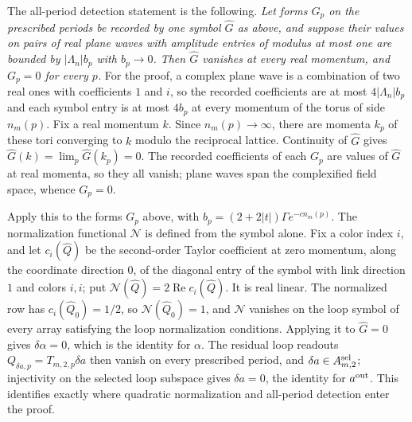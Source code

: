 The all-period detection statement is the following. \emph{Let
forms $G_p$ on the prescribed periods be recorded by one symbol
$\widehat G$ as above, and suppose their values on pairs of real
plane waves with amplitude entries of modulus at most one are bounded
by $|\Lambda_n|b_p$ with $b_p\to0$. Then $\widehat G$ vanishes at
every real momentum, and $G_p=0$ for every $p$.} For the proof, a
complex plane wave is a combination of two real ones with
coefficients $1$ and $i$, so the recorded coefficients are at most
$4|\Lambda_n|b_p$ and each symbol entry is at most $4b_p$ at every
momentum of the torus of side $n_m(p)$. Fix a real momentum $k$.
Since $n_m(p)\to\infty$, there are momenta $k_p$ of these tori
converging to $k$ modulo the reciprocal lattice. Continuity of
$\widehat G$ gives $\widehat G(k)=\lim_p\widehat G(k_p)=0$. The
recorded coefficients of each $G_p$ are values of $\widehat G$ at
real momenta, so they all vanish; plane waves span the complexified
field space, whence $G_p=0$.

Apply this to the forms $G_p$ above, with
$b_p=(2+2|t|)\Gamma e^{-cn_m(p)}$. The normalization functional
$\mathcal N$ is defined from the symbol alone. Fix a color index
$i$, and let $c_i(\widehat Q)$ be the second-order Taylor coefficient
at zero momentum, along the coordinate direction $0$, of the
diagonal entry of the symbol with link direction $1$ and colors
$i,i$; put $\mathcal N(\widehat Q)=2\operatorname{Re}c_i(\widehat Q)$.
It is real linear. The normalized row has $c_i(\widehat Q_0)=1/2$,
so $\mathcal N(\widehat Q_0)=1$, and $\mathcal N$ vanishes on the
loop symbol of every array satisfying the loop normalization
conditions. Applying it to $\widehat G=0$ gives $\delta\alpha=0$,
which is the identity for $\alpha$. The residual loop readouts
$Q_{\delta a,p}=T_{m,2,p}\delta a$ then vanish on every prescribed
period, and $\delta a\in A^{\rm sel}_{m,2}$; injectivity on the
selected loop subspace gives $\delta a=0$, the identity for
$a^{\rm out}$. This identifies exactly where quadratic normalization
and all-period detection enter the proof.

